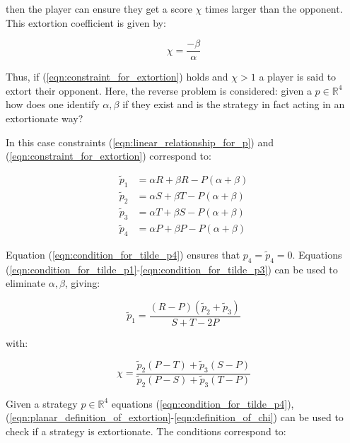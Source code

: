 \documentclass[a4paper]{article}
\begin{document}
then the player can ensure they get a score \(\chi\) times
larger than the opponent. This extortion coefficient is given by:

\begin{equation}\label{eqn:definition_of_chi}
    \chi=\frac{-\beta}{\alpha}
\end{equation}

Thus, if (\ref{eqn:constraint_for_extortion}) holds and \(\chi >1\) a player is
said to extort their opponent.
Here, the reverse problem is considered: given a
\(p\in\mathbb{R}^4\) how does one identify \(\alpha, \beta\) if they
exist and is the strategy in fact acting in an extortionate way?

In this case constraints (\ref{eqn:linear_relationship_for_p}) and
(\ref{eqn:constraint_for_extortion}) correspond to:

\begin{align}
    \tilde p_1 & = \alpha R + \beta R - P (\alpha + \beta)
            \label{eqn:condition_for_tilde_p1}\\
    \tilde p_2 & = \alpha S + \beta T - P (\alpha + \beta)
            \label{eqn:condition_for_tilde_p2}\\
    \tilde p_3 & = \alpha T + \beta S - P (\alpha + \beta)
            \label{eqn:condition_for_tilde_p3}\\
    \tilde p_4 & = \alpha P + \beta P - P (\alpha + \beta)
            \label{eqn:condition_for_tilde_p4}
\end{align}

Equation (\ref{eqn:condition_for_tilde_p4}) ensures that \(p_4=\tilde p_4=0\).
Equations (\ref{eqn:condition_for_tilde_p1}-\ref{eqn:condition_for_tilde_p3})
can be used to eliminate \(\alpha, \beta\), giving:

\begin{equation}\label{eqn:planar_definition_of_extortion}
    \tilde p_1 = \frac{(R - P)(\tilde p_2 + \tilde p_3)}{S + T - 2P}
\end{equation}

with:

\begin{equation}\label{eqn:definition_of_chi}
    \chi = \frac{\tilde p_2 (P - T) + \tilde p_3 (S - P)}
                {\tilde p_2 (P - S) + \tilde p_3 (T - P)}
\end{equation}

Given a strategy \(p\in\mathbb{R}^{4}\) equations
(\ref{eqn:condition_for_tilde_p4}), (\ref{eqn:planar_definition_of_extortion}-\ref{eqn:definition_of_chi}) can be used to check if
a strategy is extortionate. The conditions correspond to:
\end{document}

